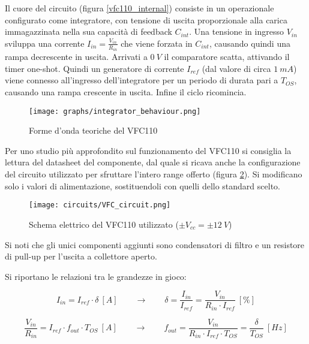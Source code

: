 Il cuore del circuito (figura \ref{vfc110_internal}) consiste in un operazionale configurato
come integratore, con tensione di uscita proporzionale alla carica immagazzinata nella sua
capacità di feedback $C_{int}$. Una tensione in ingresso $V_{in}$ sviluppa una corrente
$I_{in}=\frac{V_{in}}{R_{in}}$ che viene forzata in $C_{int}$, causando quindi una rampa
decrescente in uscita. Arrivati a $0\ V$ il comparatore scatta, attivando il timer one-shot.
Quindi un generatore di corrente $I_{ref}$ (dal valore di circa $1\ mA$) viene connesso
all'ingresso dell'integratore per un periodo di durata pari a $T_{OS}$, causando una rampa
crescente in uscita. Infine il ciclo ricomincia.

\begin{figure}[H]
    \centering
    \texttt{[image: graphs/integrator\_behaviour.png]}
    \caption{Forme d'onda teoriche del VFC110}
    \label{integrator_behaviour}
\end{figure}

Per uno studio più approfondito sul funzionamento del VFC110 si consiglia la lettura del
datasheet del componente, dal quale si ricava anche la configurazione del circuito utilizzato
per sfruttare l'intero range offerto (figura \ref{VFC_circuit}). Si modificano solo i valori
di alimentazione, sostituendoli con quelli dello standard scelto.

\begin{figure}[H]
    \centering
    \texttt{[image: circuits/VFC\_circuit.png]}
    \caption{Schema elettrico del VFC110 utilizzato ($\pm V_{cc}=\pm 12\ V$)}
    \label{VFC_circuit}
\end{figure}

Si noti che gli unici componenti aggiunti sono condensatori di filtro e un resistore di
pull-up per l'uscita a collettore aperto.

Si riportano le relazioni tra le grandezze in gioco:

\begin{displaymath}
    I_{in}=I_{ref}\cdot\delta\ [A]
    \qquad
    \rightarrow
    \qquad
    \delta=\frac{I_{in}}{I_{ref}}=\frac{V_{in}}{R_{in}\cdot I_{ref}}\ [\%]
\end{displaymath}

\begin{displaymath}
    \frac{V_{in}}{R_{in}}=I_{ref}\cdot f_{out}\cdot T_{OS}\ [A]
    \qquad
    \rightarrow
    \qquad
    f_{out}=\frac{V_{in}}{R_{in}\cdot I_{ref}\cdot T_{OS}}=\frac{\delta}{T_{OS}}\ [Hz]
\end{displaymath}


